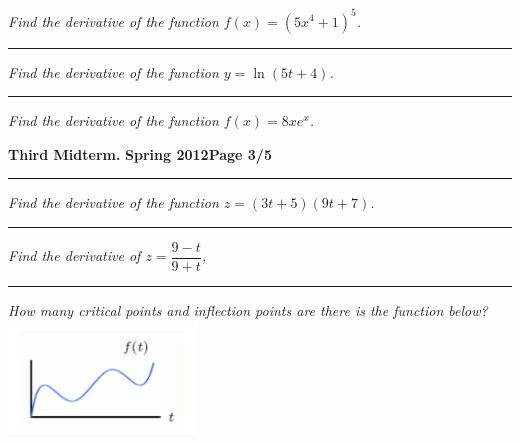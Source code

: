 \documentclass[12pt]{article}
\begin{document}
\bigskip
{\problem[10 pts] \em Find the derivative of the function
  $f(x)=(5x^4+1)^5$.}
\vspace{4.5cm}
\begin{flushright}
\end{flushright}
\hrule
{\problem[10 pts] \em Find the derivative of the function $y=\ln
  (5t+4)$.}
\vspace{4.5cm}
\begin{flushright}
\end{flushright}

\hrule
{\problem[10 pts] \em Find the derivative of the function
  $f(x)=8xe^x$.}
\vspace{4.5cm}
\begin{flushright}
\end{flushright}
\newpage

\hfill{\large\bf Third Midterm.}\hfill{\large\bf
  Spring 2012}\hfill{\large\bf Page 3/5}\hrule

\bigskip
{\problem[10 pts] \em Find the derivative of the function
  $z=(3t+5)(9t+7)$.}
\vspace{4.5cm}
\begin{flushright}
\end{flushright}
\hrule
{\problem[10 pts] \em  Find the derivative of $z=\dfrac{9-t}{9+t}$,}
\vspace{4.5cm}
\begin{flushright}
\end{flushright}
\hrule
{\problem[10 pts] \em  How many critical points and inflection points
  are there is the function below?}
\includegraphics[width=5cm]{crit-n-inflection.pdf}
\begin{flushright}
\end{flushright}
\newpage
\end{document}
